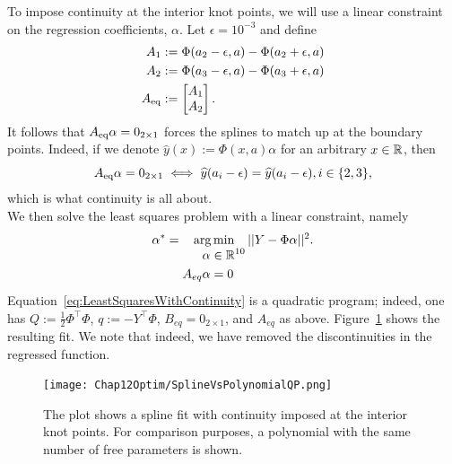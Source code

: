 To impose continuity at the interior knot points, we will use a linear constraint on the regression coefficients, $\alpha$. Let $\epsilon=10^{-3}$ and define 
\begin{equation}
    \label{eq:ContinuityKnotPoints}
    \begin{aligned}
        A_1&:= \Phi(a_2-\epsilon,a) - \Phi(a_2+\epsilon,a)\\
        A_2& := \Phi(a_3-\epsilon,a) - \Phi(a_3+\epsilon,a) \\
        A_{\rm eq}&:= \begin{bmatrix}
        A_1 \\ A_2
        \end{bmatrix}.
    \end{aligned}
\end{equation}
It follows that $A_{\rm eq}\alpha = 0_{2 \times 1}$ forces the splines to match up at the boundary points. Indeed, if we denote $\widehat y(x):= \Phi(x, a) \alpha$ for an arbitrary $x \in \mathbb R$, then 
$$A_{\rm eq}\alpha = 0_{2 \times 1} \iff \widehat y(a_i-\epsilon) = \widehat y(a_i-\epsilon), i\in \{2, 3 \}, $$
which is what continuity is all about.\\

We then solve the least squares problem with a linear constraint, namely
\begin{equation}
    \label{eq:LeastSquaresWithContinuity}
     \alpha^\ast = \operatorname*{arg\,min}_{ 
     \begin{aligned}
     \alpha &\in \mathbb R^{10} \\
     A_{eq} \alpha &= 0
     \end{aligned}
     } || Y - \Phi \alpha||^2. 
\end{equation}
Equation~\ref{eq:LeastSquaresWithContinuity} is a quadratic program; indeed, one has $Q:=\frac{1}{2} \Phi^\top \Phi$, $q:=-Y^\top \Phi$, $B_{eq} = 0_{2 \times 1}$, and $A_{eq}$ as above. Figure~\ref{fig:SplineVsPolynomialQP} shows the resulting fit. We note that indeed, we have removed the discontinuities in the regressed function. 

\begin{figure}[thb]%
\centering
\texttt{[image: Chap12Optim/SplineVsPolynomialQP.png]}%
\caption[]{The plot shows a spline fit with continuity imposed at the interior knot points. For comparison purposes, a polynomial with the same number of free parameters is shown.}    
\label{fig:SplineVsPolynomialQP}
\end{figure}

\Qed

